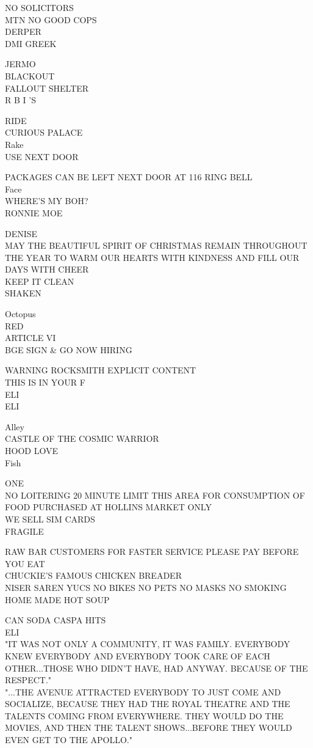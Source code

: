 \documentclass[10pt,letterpaper]{article}
\begin{document}
NO SOLICITORS\\
MTN NO GOOD COPS\\
DERPER\\
DMI GREEK

JERMO\\
BLACKOUT\\
FALLOUT SHELTER\\
R B I 'S

RIDE\\
CURIOUS PALACE\\
Rake\\
USE NEXT DOOR

PACKAGES CAN BE LEFT NEXT DOOR AT 116 RING BELL\\
Face\\
WHERE'S MY BOH?\\
RONNIE MOE

DENISE\\
MAY THE BEAUTIFUL SPIRIT OF CHRISTMAS REMAIN THROUGHOUT THE YEAR TO WARM OUR HEARTS WITH KINDNESS AND FILL OUR DAYS WITH CHEER\\
KEEP IT CLEAN\\
SHAKEN

Octopus\\
RED\\
ARTICLE VI\\
BGE SIGN \& GO NOW HIRING

WARNING ROCKSMITH EXPLICIT CONTENT\\
THIS IS IN YOUR F\\
ELI\\
ELI

Alley\\
CASTLE OF THE COSMIC WARRIOR\\
HOOD LOVE\\
Fish

ONE\\
NO LOITERING 20 MINUTE LIMIT THIS AREA FOR CONSUMPTION OF FOOD PURCHASED AT HOLLINS MARKET ONLY\\
WE SELL SIM CARDS\\
FRAGILE

RAW BAR CUSTOMERS FOR FASTER SERVICE PLEASE PAY BEFORE YOU EAT\\
CHUCKIE'S FAMOUS CHICKEN BREADER\\
NISER SAREN YUCS NO BIKES NO PETS NO MASKS NO SMOKING\\
HOME MADE HOT SOUP

CAN SODA CASPA HITS\\
ELI\\
"IT WAS NOT ONLY A COMMUNITY, IT WAS FAMILY.  EVERYBODY KNEW EVERYBODY AND EVERYBODY TOOK CARE OF EACH OTHER...THOSE WHO DIDN'T HAVE, HAD ANYWAY.  BECAUSE OF THE RESPECT."\\
"...THE AVENUE ATTRACTED EVERYBODY TO JUST COME AND SOCIALIZE, BECAUSE THEY HAD THE ROYAL THEATRE AND THE TALENTS COMING FROM EVERYWHERE.  THEY WOULD DO THE MOVIES, AND THEN THE TALENT SHOWS...BEFORE THEY WOULD EVEN GET TO THE APOLLO."
\end{document}

